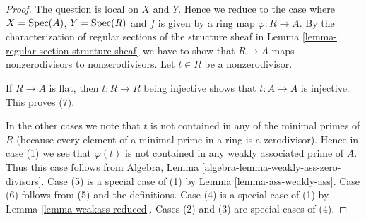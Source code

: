 \begin{proof}
The question is local on $X$ and $Y$. Hence we reduce to the case where
$X = \mathop{\mathrm{Spec}}(A)$, $Y = \mathop{\mathrm{Spec}}(R)$ and $f$ is given by a ring map
$\varphi : R \to A$.
By the characterization of regular sections of the structure sheaf
in Lemma \ref{lemma-regular-section-structure-sheaf} we have to
show that $R \to A$ maps nonzerodivisors to nonzerodivisors.
Let $t \in R$ be a nonzerodivisor.

\medskip\noindent
If $R \to A$ is flat, then $t : R \to R$ being injective
shows that $t : A \to A$ is injective. This proves (7).

\medskip\noindent
In the other cases we note that $t$ is not contained in any of
the minimal primes of $R$ (because every element of a minimal
prime in a ring is a zerodivisor).
Hence in case (1) we see that $\varphi(t)$ is not contained
in any weakly associated prime of $A$. Thus this case follows from
Algebra, Lemma \ref{algebra-lemma-weakly-ass-zero-divisors}.
Case (5) is a special case of (1) by Lemma \ref{lemma-ass-weakly-ass}.
Case (6) follows from (5) and the definitions.
Case (4) is a special case of (1) by
Lemma \ref{lemma-weakass-reduced}.
Cases (2) and (3) are special cases of (4).
\end{proof}


